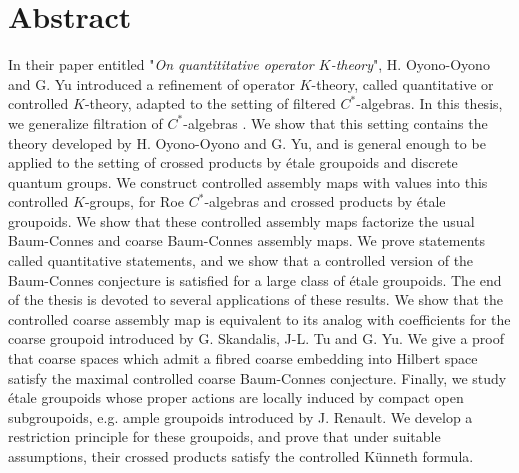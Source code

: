 \section*{Abstract}
In their paper entitled "\textit{On quantititative operator $K$-theory}", H. Oyono-Oyono and G. Yu introduced a refinement of operator $K$-theory, called quantitative or controlled $K$-theory, adapted to the setting of filtered $C^*$-algebras. In this thesis, we generalize filtration of $C^*$-algebras . We show that this setting contains the theory developed by H. Oyono-Oyono and G. Yu, and is general enough to be applied to the setting of crossed products by étale groupoids and discrete quantum groups. We construct controlled assembly maps with values into this controlled $K$-groups, for Roe $C^*$-algebras and crossed products by étale groupoids. We show that these controlled assembly maps factorize the usual Baum-Connes and coarse Baum-Connes assembly maps. We prove statements called quantitative statements, and we show that a controlled version of the Baum-Connes conjecture is satisfied for a large class of étale groupoids. The end of the thesis is devoted to several applications of these results. We show that the controlled coarse assembly map is equivalent to its analog with coefficients for the coarse groupoid introduced by G. Skandalis, J-L. Tu and G. Yu. We give a proof that coarse spaces which admit a fibred coarse embedding into Hilbert space satisfy the maximal controlled coarse Baum-Connes conjecture. Finally, we study étale groupoids whose proper actions are locally induced by compact open subgroupoids, e.g. ample groupoids introduced by J. Renault. We develop a restriction principle for these groupoids, and prove that under suitable assumptions, their crossed products satisfy the controlled Künneth formula.



